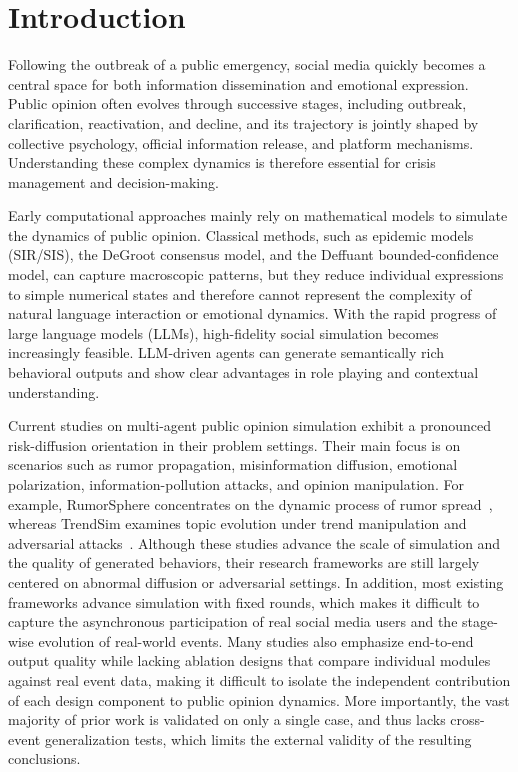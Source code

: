 \section{Introduction}

Following the outbreak of a public emergency, social media quickly becomes a central space for both information dissemination and emotional expression. Public opinion often evolves through successive stages, including outbreak, clarification, reactivation, and decline, and its trajectory is jointly shaped by collective psychology, official information release, and platform mechanisms. Understanding these complex dynamics is therefore essential for crisis management and decision-making.

Early computational approaches mainly rely on mathematical models to simulate the dynamics of public opinion. Classical methods, such as epidemic models (SIR/SIS), the DeGroot consensus model, and the Deffuant bounded-confidence model, can capture macroscopic patterns, but they reduce individual expressions to simple numerical states and therefore cannot represent the complexity of natural language interaction or emotional dynamics. With the rapid progress of large language models (LLMs), high-fidelity social simulation becomes increasingly feasible. LLM-driven agents can generate semantically rich behavioral outputs and show clear advantages in role playing and contextual understanding.

Current studies on multi-agent public opinion simulation exhibit a pronounced risk-diffusion orientation in their problem settings. Their main focus is on scenarios such as rumor propagation, misinformation diffusion, emotional polarization, information-pollution attacks, and opinion manipulation. For example, RumorSphere concentrates on the dynamic process of rumor spread~\cite{liu2025rumorsphere}, whereas TrendSim examines topic evolution under trend manipulation and adversarial attacks~\cite{zhang2025trendsim}. Although these studies advance the scale of simulation and the quality of generated behaviors, their research frameworks are still largely centered on abnormal diffusion or adversarial settings. In addition, most existing frameworks advance simulation with fixed rounds, which makes it difficult to capture the asynchronous participation of real social media users and the stage-wise evolution of real-world events. Many studies also emphasize end-to-end output quality while lacking ablation designs that compare individual modules against real event data, making it difficult to isolate the independent contribution of each design component to public opinion dynamics. More importantly, the vast majority of prior work is validated on only a single case, and thus lacks cross-event generalization tests, which limits the external validity of the resulting conclusions.

